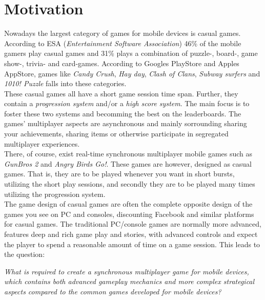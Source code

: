 \section{Motivation} \label{sec:motivation}
Nowadays the largest category of games for mobile devices is casual games. According to ESA\cite{ESA}\cite{ESApdf} (\textit{Entertainment Software Association}) 46\% of the mobile gamers play casual games and 31\% plays a combination of puzzle-, board-, game show-, trivia- and card-games. 
According to Googles PlayStore \cite{googleplay} and Apples AppStore\cite{appstore}, games like \textit{Candy Crush}, \textit{Hay day}, \textit{Clash of Clans}, \textit{Subway surfers} and \textit{1010! Puzzle} falls into these categories.\\

These casual games all have a short game session time span. Further, they contain a \textit{progression system} and/or a \textit{high score system}. The main focus is to foster these two systems and becomming the best on the leaderboards. The games' multiplayer aspects are asynchronous and mainly sorrounding sharing your achievements, sharing items or otherwise participate in segregated multiplayer experiences.\\

There, of course, exist real-time synchronous multiplayer mobile games such as \textit{GunBros 2} and \textit{Angry Birds Go!}. These games are however, designed as casual games. That is, they are to be played whenever you want in short bursts, utilizing the short play sessions, and secondly they are to be played many times utilizing the progression system.\\

The game design of casual games are often the complete opposite design of the games you see on PC and consoles, discounting Facebook and similar platforms for casual games. The traditional PC/console games are normally more advanced, features deep and rich game play and stories, with advanced controls and expect the player to spend a reasonable amount of time on a game session. This leads to the question:
\begin{center}
\textit{What is required to create a synchronous multiplayer game for mobile devices, which contains both advanced gameplay mechanics and more complex strategical aspects compared to the common games developed for mobile devices?}
\end{center}



